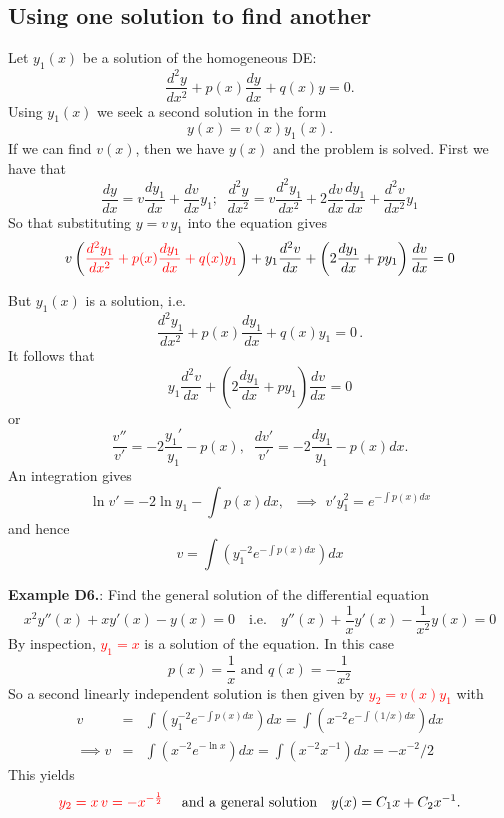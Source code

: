 \documentclass{article}
\begin{document}
\subsection{Using one solution to find another}

Let $y_1 (x)$ be a solution of the homogeneous DE:
$$
\frac{d^2 y}{dx^2} + p(x) \frac{dy}{dx} + q(x) y = 0.
$$
Using $y_1(x)$ we seek a second solution in the form
$$
y(x)= v(x) y_1(x).
$$
If we can find $v(x)$, then we have $y(x)$ and the problem is solved.  First we have that
$$
\frac{d y}{dx}=v\frac{d y_1}{dx}+ \frac{d v}{dx}  y_1;\;\;
\frac{d^2 y}{dx^2}=v\frac{d^2 y_1}{dx^2}+ 2\frac{d v}{dx}\frac{d
y_1}{dx} + \frac{d^2 v}{dx^2}  y_1
$$
So that substituting $y=v \, y_1$ into the equation gives
$$
v \left(\textcolor{red}{\frac{d^2 y_1}{dx^2} + p(x) \frac{dy_1}{dx} + q(x) y_1}\right) + y_1 \frac{d^2 v}{dx}+ \left(2 \frac{d y_1}{dx}+ p y_1
\right) \frac{d v}{dx}=0
$$

But $y_1 (x)$ is a solution, i.e.
$$
\frac{d^2 y_1}{dx^2} + p(x) \frac{dy_1}{dx} + q(x) y_1 = 0\,.
$$
It follows that
$$
 y_1 \frac{d^2 v}{dx}+ \left(2 \frac{d y_1}{dx}+ p y_1
\right) \frac{d v}{dx}=0
$$
or
$$
\frac{v''}{v'}= -2 \frac{ y_1'}{y_1}-p(x), \;\; \frac{ d v'}{v'}=
-2 \frac{ d y_1}{y_1}- p(x) dx.
$$
An integration gives
$$
\ln v'= -2 \ln y_1 - \int p(x) dx, \;\;   \implies \,\, v' y_1^2= e^{- \int
p(x) dx}
$$
and hence
$$
 v= \int \left( y_1^{-2}  e^{- \int p(x) dx} \right) dx
$$

\hrulefill

\textbf{Example D6.}: Find the general solution of the
differential equation
$$
x^2 y''(x) + xy' (x) -y (x)=0 \quad \mbox{i.e.} \quad y''(x) + \frac{1}{x} y' (x) - \frac{1}{x^2} y (x)=0
$$
By inspection, \textcolor{red}{$y_1=x$} is a solution of the equation. In this case
$$
p(x) = \frac{1}{x} \mbox{  and  } q(x) = -\frac{1}{x^2}
$$
So a second linearly independent solution is then given by \textcolor{red}{$y_2=v(x) y_1$} with
{\small
$$
\begin{array}{lll}
 v & = & \int \left( y_1^{-2}  e^{- \int p(x) dx} \right) dx =  \int \left( x^{-2}  e^{- \int (1/x) dx} \right) dx \\
 \implies v & = & \int \left( x^{-2}  e^{-\ln x}  \right) dx =\int \left( x^{-2} x^{-1}  \right) dx
 =- x^{-2}/2
 \end{array}
$$
}
This yields
$$
\textcolor{red}{y_2 = x \, v=- x^{-\frac{1}{2}}}
\quad \mbox{ and a general solution} \quad 
y(x)=C_1 x + C_2  x^{-1}.
$$

\end{document}
